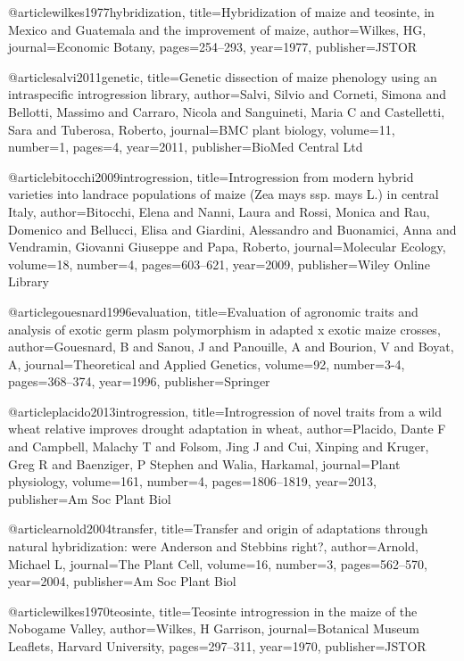 @article{wilkes1977hybridization,
  title={Hybridization of maize and teosinte, in Mexico and Guatemala and the improvement of maize},
  author={Wilkes, HG},
  journal={Economic Botany},
  pages={254--293},
  year={1977},
  publisher={JSTOR}
}

@article{salvi2011genetic,
  title={Genetic dissection of maize phenology using an intraspecific introgression library},
  author={Salvi, Silvio and Corneti, Simona and Bellotti, Massimo and Carraro, Nicola and Sanguineti, Maria C and Castelletti, Sara and Tuberosa, Roberto},
  journal={BMC plant biology},
  volume={11},
  number={1},
  pages={4},
  year={2011},
  publisher={BioMed Central Ltd}
}

@article{bitocchi2009introgression,
  title={Introgression from modern hybrid varieties into landrace populations of maize (Zea mays ssp. mays L.) in central Italy},
  author={Bitocchi, Elena and Nanni, Laura and Rossi, Monica and Rau, Domenico and Bellucci, Elisa and Giardini, Alessandro and Buonamici, Anna and Vendramin, Giovanni Giuseppe and Papa, Roberto},
  journal={Molecular Ecology},
  volume={18},
  number={4},
  pages={603--621},
  year={2009},
  publisher={Wiley Online Library}
}

@article{gouesnard1996evaluation,
  title={Evaluation of agronomic traits and analysis of exotic germ plasm polymorphism in adapted x exotic maize crosses},
  author={Gouesnard, B and Sanou, J and Panouille, A and Bourion, V and Boyat, A},
  journal={Theoretical and Applied Genetics},
  volume={92},
  number={3-4},
  pages={368--374},
  year={1996},
  publisher={Springer}
}

@article{placido2013introgression,
  title={Introgression of novel traits from a wild wheat relative improves drought adaptation in wheat},
  author={Placido, Dante F and Campbell, Malachy T and Folsom, Jing J and Cui, Xinping and Kruger, Greg R and Baenziger, P Stephen and Walia, Harkamal},
  journal={Plant physiology},
  volume={161},
  number={4},
  pages={1806--1819},
  year={2013},
  publisher={Am Soc Plant Biol}
}

@article{arnold2004transfer,
  title={Transfer and origin of adaptations through natural hybridization: were Anderson and Stebbins right?},
  author={Arnold, Michael L},
  journal={The Plant Cell},
  volume={16},
  number={3},
  pages={562--570},
  year={2004},
  publisher={Am Soc Plant Biol}
}

@article{wilkes1970teosinte,
  title={Teosinte introgression in the maize of the Nobogame Valley},
  author={Wilkes, H Garrison},
  journal={Botanical Museum Leaflets, Harvard University},
  pages={297--311},
  year={1970},
  publisher={JSTOR}
}

